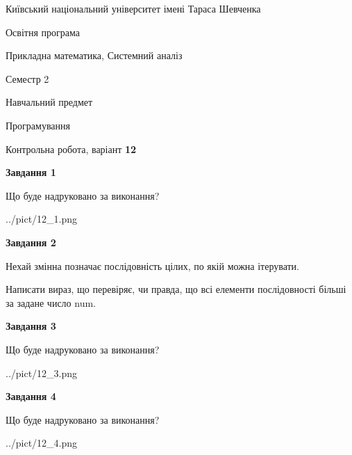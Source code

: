 \documentclass[12pt, ukrainian]{article}
\begin{document}
{{\begin {small}\par
{ \center  Київський національний університет імені Тараса Шевченка \par}
{\parbox {5 cm}{Освітня програма \hfill}{\parbox {8 cm}{Прикладна математика, Системний аналіз \hfill}}\parbox {5 cm}{\hfill Семестр 2}}\par
{\parbox {5 cm} {Навчальний предмет \hfill}\parbox {7 cm}{Програмування \hfill}\parbox {6cm}{\hfill}\par}\vspace{-7pt} \end{small}}{\center Контрольна робота, варіант  \No \textbf
{ 12 }\par}}
{
\begin {large}
{\begin {center}\textbf{Завдання 1}\end {center}}\par
Що буде надруковано за виконання?\par\par
\begin{center}
	{../pict/12_1.png}
\end{center}
\newpage

{\begin {center}\textbf{Завдання 2}\end {center}}\par
Нехай змінна  позначає послідовність цілих, по якій можна ітерувати.

Написати вираз, що перевіряє, чи правда, що всі елементи послідовності більші за задане число num.\par
\newpage

{\begin {center}\textbf{Завдання 3}\end {center}}\par
Що буде надруковано за виконання?\par
\begin{center}
	{../pict/12_3.png}
\end{center}
\newpage

{\begin {center}\textbf{Завдання 4}\end {center}}\par
Що буде надруковано за виконання?\par
\begin{center}
	{../pict/12_4.png}
\end{center}
\newpage


\end{large}}
\end{document}
